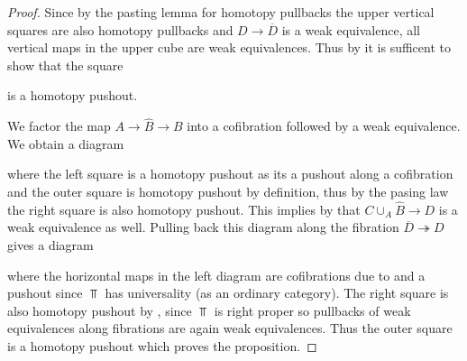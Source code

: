 \begin{lemma}
\begin{proof}
        Since by the pasting lemma for homotopy pullbacks the upper vertical squares are also homotopy pullbacks and $D\to\overline{D}$ is a weak equivalence, all vertical maps in the upper cube are weak equivalences.
        Thus by %
        it is sufficent to show that the square
        \begin{center}
        \end{center}
        is a homotopy pushout.

        We factor the map $A\to\widehat{B}\to B$ into a cofibration followed by a weak equivalence.
        We obtain a diagram 
        \begin{center}
        \end{center}
        where the left square is a homotopy pushout as its a pushout along a cofibration and the outer square is homotopy pushout by definition, thus by the pasing law the right square is also homotopy pushout. 
        This implies by %
        that $C\cup_{A}\widehat{B}\to D$ is a weak equivalence as well.
        Pulling back this diagram along the fibration $\overline{D}\twoheadrightarrow D$ gives a diagram 
        \begin{center}
        \end{center}
        where the horizontal maps in the left diagram are cofibrations due to %
        and a pushout since $\Top$ has universality (as an ordinary category).
        The right square is also homotopy pushout by %
        , since $\Top$ is right proper so pullbacks of weak equivalences along fibrations are again weak equivalences. 
        Thus the outer square is a homotopy pushout which proves the proposition. 
    \end{proof}
\end{lemma}
